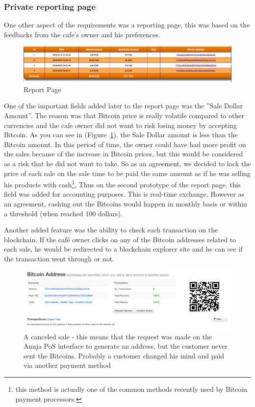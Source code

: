\subsubsection{Private reporting page}
One other aspect of the requirements was a reporting page, this was based on the feedbacks from the cafe's owner and his preferences.

\begin{figure}[htb!p]
\centering
\includegraphics[width=\linewidth]{fig/report_page.png}
  \caption{Report Page}
\label{fig:report_page}
\end{figure}

One of the important fields added later to the report page was the ''Sale Dollar Amount''. The reason was that Bitcoin price is really volatile compared to other currencies and the cafe owner did not want to risk losing money by accepting Bitcoin. As you can see in (Figure~\ref{fig:report_page}), the Sale Dollar amount is less than the Bitcoin amount. In this period of time, the owner could have had more profit on the sales because of the increase in Bitcoin prices, but this would be considered as a risk that he did not want to take. So as an agreement, we decided to lock the price of each sale on the sale time to be paid the same amount as if he was selling his products with cash\footnote{this method is actually one of the common methods recently used by Bitcoin payment processors.}, Thus on the second prototype of the report page, this field was added for accounting purposes. This is real-time exchange, However as an agreement, cashing out the Bitcoins would happen in monthly basis or within a threshold (\eg when reached 100 dollars).

Another added feature was the ability to check each transaction on the blockchain. If the café owner clicks on any of the Bitcoin addresses related to each sale, he would be redirected to a blockchain explorer site and he can see if the transaction went through or not.

\begin{figure}[htb!p]
\centering
\includegraphics[width=\linewidth]{fig/canceled_sale.png}
  \caption{A canceled sale - this means that the request was made on the Aunja PoS interface to generate an address, but the customer never sent the Bitcoins. Probably a customer changed his mind and paid via another payment method}
\label{fig:canceled_sale}
\end{figure}


